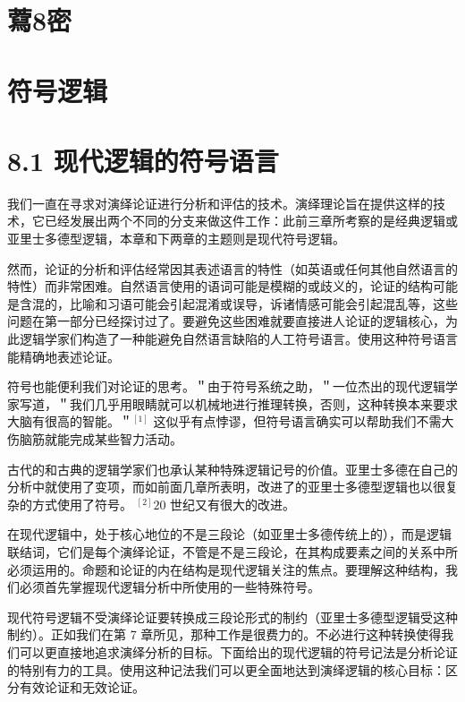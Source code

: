 \section*{藛8密}
\section*{符号逻辑}
\section*{8.1 现代逻辑的符号语言}
我们一直在寻求对演绎论证进行分析和评估的技术。演绎理论旨在提供这样的技术，它已经发展出两个不同的分支来做这件工作：此前三章所考察的是经典逻辑或亚里士多德型逻辑，本章和下两章的主题则是现代符号逻辑。

然而，论证的分析和评估经常因其表述语言的特性（如英语或任何其他自然语言的特性）而非常困难。自然语言使用的语词可能是模糊的或歧义的，论证的结构可能是含混的，比喻和习语可能会引起混淆或误导，诉诸情感可能会引起混乱等，这些问题在第一部分已经探讨过了。要避免这些困难就要直接进人论证的逻辑核心，为此逻辑学家们构造了一种能避免自然语言缺陷的人工符号语言。使用这种符号语言能精确地表述论证。

符号也能便利我们对论证的思考。＂由于符号系统之助，＂一位杰出的现代逻辑学家写道，＂我们几乎用眼睛就可以机械地进行推理转换，否则，这种转换本来要求大脑有很高的智能。＂${ }^{[1]}$ 这似乎有点悖谬，但符号语言确实可以帮助我们不需大伤脑筋就能完成某些智力活动。

古代的和古典的逻辑学家们也承认某种特殊逻辑记号的价值。亚里士多德在自己的分析中就使用了变项，而如前面几章所表明，改进了的亚里士多德型逻辑也以很复杂的方式使用了符号。 ${ }^{[2]} 20$ 世纪又有很大的改进。

在现代逻辑中，处于核心地位的不是三段论（如亚里士多德传统上的），而是逻辑联结词，它们是每个演绎论证，不管是不是三段论，在其构成要素之间的关系中所必须运用的。命题和论证的内在结构是现代逻辑关注的焦点。要理解这种结构，我们必须首先掌握现代逻辑分析中所使用的一些特殊符号。

现代符号逻辑不受演绎论证要转换成三段论形式的制约（亚里士多德型逻辑受这种制约）。正如我们在第 7 章所见，那种工作是很费力的。不必进行这种转换使得我们可以更直接地追求演绎分析的目标。下面给出的现代逻辑的符号记法是分析论证的特别有力的工具。使用这种记法我们可以更全面地达到演绎逻辑的核心目标：区分有效论证和无效论证。 